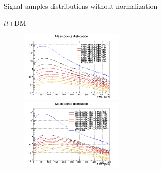 \documentclass[8pt]{beamer}
\begin{document}
\begin{frame}{Signal samples distributions without normalization}
\vspace{-5pt}
\begin{block}{\centering $t \bar t$+DM}\end{block} \vspace{-10pt}
\begin{figure}[htbp]
\centering
\begin{minipage}[b]{.49\textwidth}
\begin{center}
\includegraphics[width=5.2cm, height=3.5cm]{figs/scalarMETmChi1.png}
\end{center}
\end{minipage}\hfill
\begin{minipage}[b]{.49\textwidth}
\begin{center}
\includegraphics[width=5.2cm, height=3.5cm]{figs/pseudoscalarMETmChi1.png}
\end{center}
\end{minipage} \hfill
\end{figure} \vfill
\end{frame}
\end{document}
